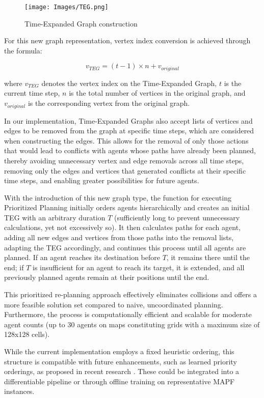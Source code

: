 \begin{figure}
    \centering
    \texttt{[image: Images/TEG.png]}
    \caption{Time-Expanded Graph construction}
    \label{TEG}
\end{figure}

For this new graph representation, vertex index conversion is achieved through the formula:

\[ v_{TEG} = (t-1) \times n + v_{original} \tag{10} \]

where $ v_{TEG} $ denotes the vertex index on the Time-Expanded Graph, $ t $ is the current time step, $ n $ is the total number of vertices in the original graph, and $ v_{original} $ is the corresponding vertex from the original graph.

In our implementation, Time-Expanded Graphs also accept lists of vertices and edges to be removed from the graph at specific time steps, which are considered when constructing the edges. This allows for the removal of only those actions that would lead to conflicts with agents whose paths have already been planned, thereby avoiding unnecessary vertex and edge removals across all time steps, removing only the edges and vertices that generated conflicts at their specific time steps, and enabling greater possibilities for future agents.

With the introduction of this new graph type, the function for executing Prioritized Planning initially orders agents hierarchically and creates an initial TEG with an arbitrary duration $ T $ (sufficiently long to prevent unnecessary calculations, yet not excessively so). It then calculates paths for each agent, adding all new edges and vertices from those paths into the removal lists, adapting the TEG accordingly, and continues this process until all agents are planned. If an agent reaches its destination before $ T $, it remains there until the end; if $ T $ is insufficient for an agent to reach its target, it is extended, and all previously planned agents remain at their positions until the end.

This prioritized re-planning approach effectively eliminates collisions and offers a more feasible solution set compared to naive, uncoordinated planning. Furthermore, the process is computationally efficient and scalable for moderate agent counts (up to 30 agents on maps constituting grids with a maximum size of 128x128 cells).

While the current implementation employs a fixed heuristic ordering, this structure is compatible with future enhancements, such as learned priority orderings, as proposed in recent research \cite{zhangLearningPriorityOrdering2022}. These could be integrated into a differentiable pipeline or through offline training on representative MAPF instances.

